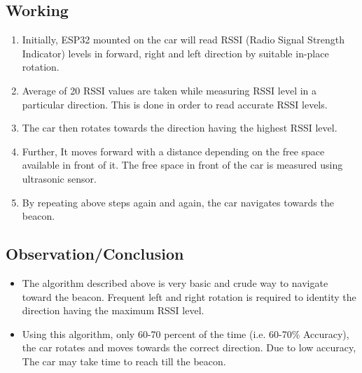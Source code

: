 \documentclass[journal,12pt,twocolumn]{IEEEtran}
\begin{document}
\subsection{\textbf{Working}}
\begin{enumerate}
    \item Initially, ESP32 mounted on the car will read RSSI (Radio Signal Strength Indicator) levels in forward, right and left direction by suitable in-place rotation.
    \item Average of 20 RSSI values are taken while measuring RSSI level in a particular direction. This is done in order to read accurate RSSI levels.
    \item The car then rotates towards the direction having the highest RSSI level.
    \item Further, It moves forward with a distance depending on the free space available in front of it. The free space in front of the car is measured using ultrasonic sensor.
    \item By repeating above steps again and again, the car navigates towards the beacon.
\end{enumerate}
\subsection{\textbf{Observation/Conclusion}}
\begin{itemize}
    \item The algorithm described above is very basic and crude way to navigate toward the beacon. Frequent left and right rotation is required to identity the direction having the maximum RSSI level.
    \item Using this algorithm, only 60-70 percent of the time (i.e. 60-70\% Accuracy), the car rotates and moves towards the correct direction. Due to low accuracy, The car may take time to reach till the beacon. 
\end{itemize}
\end{document}
